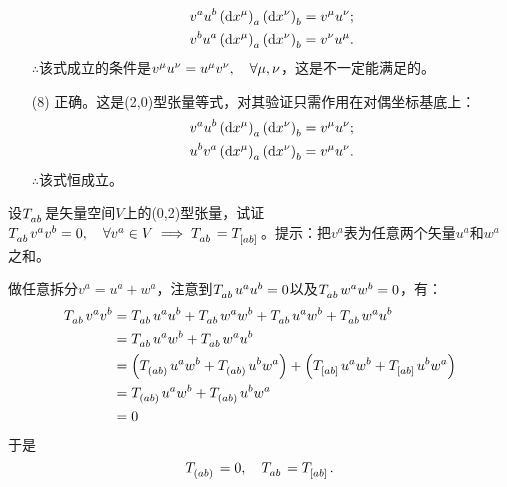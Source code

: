 \begin{xiti}
\begin{jie}
\begin{enumerate}
    		\begin{align*}
    		\tensor{v}{^a} \tensor{u}{^b} \tensor{\left(\dd{x^\mu}\right)}{_a} \tensor{\left(\dd{x^\nu}\right)}{_b}&=\tensor{v}{^\mu} \tensor{u}{^\nu};\\
    		\tensor{v}{^b} \tensor{u}{^a} \tensor{\left(\dd{x^\mu}\right)}{_a} \tensor{\left(\dd{x^\nu}\right)}{_b}&=\tensor{v}{^\nu} \tensor{u}{^\mu}.
    		\end{align*}
    		$\therefore$该式成立的条件是$v^\mu u^\nu=u^\mu v^\nu\qc \forall \mu,\nu $，这是不一定能满足的。
    		\item[(8)] 正确。这是(2,0)型张量等式，对其验证只需作用在对偶坐标基底上：
    		\begin{align*}
    		v^a u^b \tensor{\left(\dd{x^\mu}\right)}{_a} \tensor{\left(\dd{x^\nu}\right)}{_b}&=v^\mu u^\nu;\\
    		u^b v^a \tensor{\left(\dd{x^\mu}\right)}{_a} \tensor{\left(\dd{x^\nu}\right)}{_b}&=v^\mu u^\nu.
    		\end{align*}
    		$\therefore$该式恒成立。
    	\end{enumerate}
    \end{jie}

    \item 设$\tensor{T}{_a_b}$是矢量空间$V$上的(0,2)型张量，试证$\tensor{T}{_a_b}v^a v^b=0\qc \forall v^a \in V\implies \tensor{T}{_a_b}=\tensor{T}{_{[ab]}} $。提示：把$v^a$表为任意两个矢量$u^a $和$w^a$之和。

    \begin{zm}
    	做任意拆分$v^a=u^a+w^a$，注意到$\tensor{T}{_a_b}u^a u^b=0 $以及$\tensor{T}{_a_b}w^a w^b=0$，有：
    	\begin{align*}
    	\tensor{T}{_a_b}v^a v^b&=\tensor{T}{_a_b}u^a u^b+\tensor{T}{_a_b} w^a w^b+\tensor{T}{_a_b} u^a w^b +\tensor{T}{_a_b}w^a u^b\\
    	&=\tensor{T}{_a_b} u^a w^b +\tensor{T}{_a_b}w^a u^b\\
    	&=\left(\tensor{T}{_{\left(ab\right)}}u^a w^b+\tensor{T}{_{\left(ab\right)}}u^b w^a\right)+\left(\tensor{T}{_{\left[ab\right]}}u^a w^b+\tensor{T}{_{\left[ab\right]}}u^b w^a \right)\\
    	&=\tensor{T}{_{\left(ab\right)}}u^a w^b+\tensor{T}{_{\left(ab\right)}}u^b w^a\\
    	&=0
    	\end{align*}
    	于是
    	\begin{displaymath}
    	\tensor{T}{_{\left(ab\right)}}=0\qc \tensor{T}{_a_b}=\tensor{T}{_{\left[ab\right]}}.
    	\end{displaymath}
    \end{zm}


\end{xiti}
